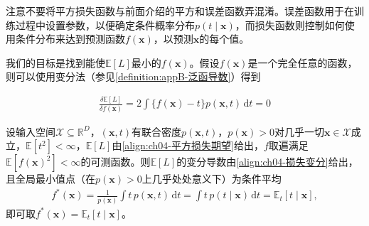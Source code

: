 \documentclass[../../main.tex]{subfiles}
\begin{document}
注意不要将平方损失函数与前面介绍的平方和误差函数弄混淆。误差函数用于在训练过程中设置参数，以便确定条件概率分布$p(t\mid\boldsymbol{x})$，而损失函数则控制如何使用条件分布来达到预测函数$f(\boldsymbol{x})$，以预测$\boldsymbol{x}$的每个值。

我们的目标是找到能使$\mathbb{E}[L]$最小的$f(\boldsymbol{x})$。假设$f(\boldsymbol{x})$是一个完全任意的函数，则可以使用变分法（参见\cref{definition:appB-泛函导数}）得到

\begin{align}
  \frac{\delta\mathbb{E}[L]}{\delta f(\boldsymbol{x})}=2\int\{f(\boldsymbol{x})-t\}p(\boldsymbol{x},t)\,\mathrm{d}t=0
  \label{align:ch04-损失变分}
\end{align}

\begin{proposition}[平方损失的最优决策规则]\label{proposition:ch04-最优决策规则}
设输入空间$\mathcal{X}\subseteq\mathbb{R}^{D}$，$(\boldsymbol{x},t)$有联合密度$p(\boldsymbol{x},t)$，$p(\boldsymbol{x})>0$对几乎一切$\boldsymbol{x}\in\mathcal{X}$成立，$\mathbb{E}[t^{2}]<\infty$，$\mathbb{E}[L]$由\eqref{align:ch04-平方损失期望}给出，$f$取遍满足$\mathbb{E}[f(\boldsymbol{x})^{2}]<\infty$的可测函数。则$\mathbb{E}[L]$的变分导数由\eqref{align:ch04-损失变分}给出，且全局最小值点（在$p(\boldsymbol{x})>0$上几乎处处意义下）为条件平均
\begin{align}
  f^*(\boldsymbol{x})=\frac{1}{p(\boldsymbol{x})}\int t\,p(\boldsymbol{x},t)\,\mathrm{d}t=\int t\,p(t\mid\boldsymbol{x})\,\mathrm{d}t=\mathbb{E}_t[t\mid\boldsymbol{x}],
  \label{align:ch04-回归函数}
\end{align}
即可取$f^*(\boldsymbol{x})=\mathbb{E}_t[t\mid\boldsymbol{x}]$。
\end{proposition}
\end{document}
